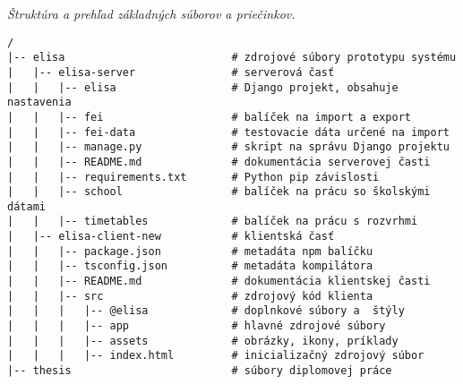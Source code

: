 \emph{Štruktúra a prehľad základných súborov a priečinkov.}

\begin{verbatim}
/
|-- elisa                          # zdrojové súbory prototypu systému
|   |-- elisa-server               # serverová časť
|   |   |-- elisa                  # Django projekt, obsahuje nastavenia
|   |   |-- fei                    # balíček na import a export
|   |   |-- fei-data               # testovacie dáta určené na import
|   |   |-- manage.py              # skript na správu Django projektu
|   |   |-- README.md              # dokumentácia serverovej časti
|   |   |-- requirements.txt       # Python pip závislosti
|   |   |-- school                 # balíček na prácu so školskými dátami
|   |   |-- timetables             # balíček na prácu s rozvrhmi
|   |-- elisa-client-new           # klientská časť
|   |   |-- package.json           # metadáta npm balíčku
|   |   |-- tsconfig.json          # metadáta kompilátora
|   |   |-- README.md              # dokumentácia klientskej časti
|   |   |-- src                    # zdrojový kód klienta
|   |   |   |-- @elisa             # doplnkové súbory a  štýly
|   |   |   |-- app                # hlavné zdrojové súbory
|   |   |   |-- assets             # obrázky, ikony, príklady
|   |   |   |-- index.html         # inicializačný zdrojový súbor
|-- thesis                         # súbory diplomovej práce

\end{verbatim}
